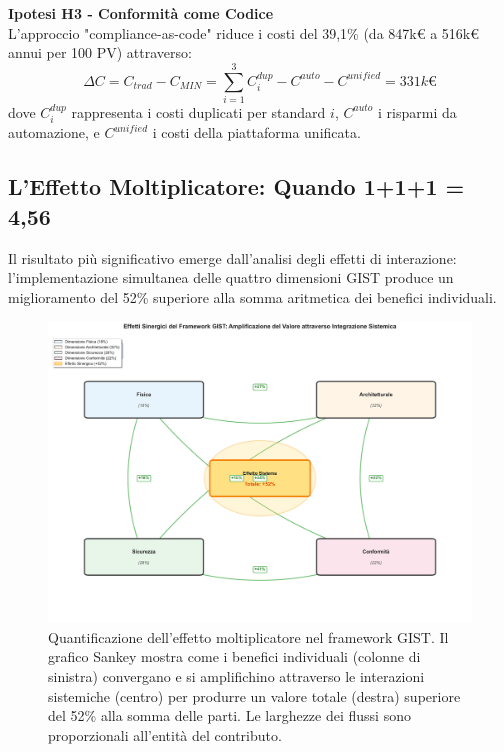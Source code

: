 \textbf{Ipotesi H3 - Conformità come Codice}\\
L'approccio "compliance-as-code" riduce i costi del 39,1\% (da 847k€ a 516k€ annui per 100 PV) attraverso:
\begin{equation}
\Delta C = C_{trad} - C_{MIN} = \sum_{i=1}^{3} C_i^{dup} - C^{auto} - C^{unified} = 331k€
\end{equation}
dove $C_i^{dup}$ rappresenta i costi duplicati per standard $i$, $C^{auto}$ i risparmi da automazione, e $C^{unified}$ i costi della piattaforma unificata.

\subsection{\texorpdfstring{L'Effetto Moltiplicatore: Quando 1+1+1 = 4,56}{5.2.3 - L'Effetto Moltiplicatore}}
\label{subsec:5.2.3}

Il risultato più significativo emerge dall'analisi degli effetti di interazione: l'implementazione simultanea delle quattro dimensioni GIST produce un miglioramento del 52\% superiore alla somma aritmetica dei benefici individuali.

\begin{figure}[htbp]
\centering
\includegraphics[width=\textwidth]{thesis_figures/cap5/synergy_effects.pdf}
\caption[Effetto moltiplicatore del framework GIST]{Quantificazione dell'effetto moltiplicatore nel framework GIST. Il grafico Sankey mostra come i benefici individuali (colonne di sinistra) convergano e si amplifichino attraverso le interazioni sistemiche (centro) per produrre un valore totale (destra) superiore del 52\% alla somma delle parti. Le larghezze dei flussi sono proporzionali all'entità del contributo.}
\label{fig:synergy_amplification}
\end{figure}

